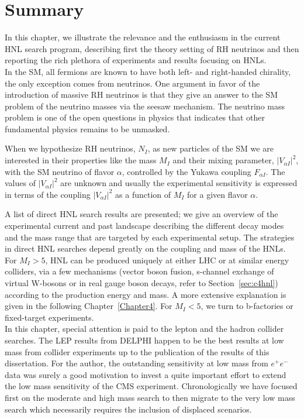 \section{Summary}
In this chapter, we illustrate the relevance and the enthusiasm in the
current HNL search program, describing first the theory setting of RH
neutrinos and then reporting the rich plethora of experiments and results
focusing on HNLs.\\
In the SM, all fermions are known to have both
left- and right-handed chirality, the only exception comes from 
neutrinos. One argument in favor of the introduction of massive RH
neutrinos is that they give an answer to the SM problem of the
neutrino masses via the seesaw mechanism. The neutrino mass
problem is one of the open questions in physics that indicates that
other fundamental physics remains to be unmasked.

When we hypothesize RH neutrinos, $N_{I}$, as new particles of the SM we
are interested in their properties like the mass $M_I$ and
their mixing parameter, $|V_{\alpha I}|^2$,  with the SM neutrino of flavor $\alpha$,
controlled by the Yukawa coupling $F_{\alpha I}$. The values of
$|V_{\alpha I}|^2$ are unknown and usually the experimental
sensitivity is expressed in terms of the coupling $|V_{\alpha I}|^2$
as a function of $M_I$ for a given flavor
$\alpha$.

A list of direct HNL search results are presented; we give an overview
of the experimental current and past landscape describing the different decay modes and
the mass range that are targeted by each experimental setup.
The strategies in direct HNL searches depend greatly on the coupling
and mass of the HNLs. For $M_{I} > 5$\GeV, HNL can be
produced uniquely at either LHC or at similar energy colliders, via a few
mechanisms (vector boson fusion, s-channel exchange of virtual
W-bosons or in real gauge boson decays, refer to Section~\ref{sec:c4hnl}) according to the production
energy and \hnl mass. A more extensive explanation is given in the following
Chapter~\ref{Chapter4}. For $M_{I} < 5$\GeV, we turn to b-factories
or fixed-target experiments. \\
In this chapter, special attention is paid to the lepton and the hadron collider
searches. The LEP results from DELPHI happen to be the best results at
low mass from collider experiments up to the publication of the results
of this dissertation. For the author, the outstanding sensitivity at low mass from
$e^{+}e^{-}$ data was surely a good motivation to invest a quite
important effort to extend the low mass sensitivity of
the CMS experiment. Chronologically we have focused first on the
moderate and high mass search to then migrate to the very low mass search which
necessarily requires the inclusion of displaced scenarios.

